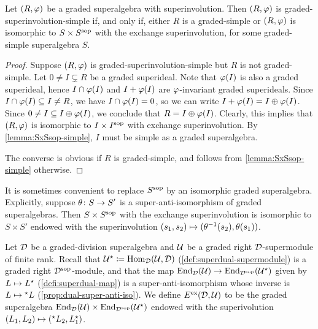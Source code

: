 \begin{prop}\label{prop:only-SxSsop-is-simple}
	Let $(R, \varphi)$ be a 
	graded superalgebra with superinvolution. 
	Then $(R, \varphi)$ is 
	graded-superinvolution-simple if, and only if, either $R$ is a graded-simple or $(R, \varphi)$ is isomorphic to $S\times S^{\mathrm{sop}}$ with the exchange superinvolution, for some graded-simple superalgebra $S$.
\end{prop}

\begin{proof}
	Suppose $(R, \varphi)$ is 
	graded-superinvolution-simple but $R$ is not graded-simple. 
	Let $0 \neq I \subsetneq R$ be a graded superideal.
	Note that $\varphi(I)$ is also a graded superideal, hence $I \cap \varphi(I)$ and $I + \varphi (I)$ are $\varphi$-invariant graded superideals. 
	Since $I \cap \varphi(I) \subseteq I \neq R$, we have $I \cap \varphi(I) = 0$, so we can write $I + \varphi (I) = I \oplus \varphi (I)$. 
	Since $0 \neq I \subseteq I \oplus \varphi (I)$, we conclude that $R = I \oplus \varphi (I)$.
	Clearly, this implies that $(R, \varphi)$ is isomorphic to $I \times I^{\mathrm{sop}}$ with exchange superinvolution. 
	By \cref{lemma:SxSsop-simple}, $I$ must be simple as a graded superalgebra. 
	
	The converse is obvious if $R$ is graded-simple, and follows from \cref{lemma:SxSsop-simple} otherwise.
\end{proof}
 
It is sometimes convenient to replace $S^{\mathrm{sop}}$ by an isomorphic graded superalgebra. 
Explicitly, suppose $\theta\colon S \to S'$ is a super-anti-isomorphism of graded superalgebras. 
Then $S\times S^{\mathrm{sop}}$ with the exchange superinvolution is isomorphic to $S\times S'$ endowed with the superinvolution $(s_1, s_2) \mapsto (\theta^{-1} (s_2), \theta (s_1))$. 

\begin{defi}\label{defi:superdual-exchange}
    Let $\mathcal{D}$ be a graded-division superalgebra and $\mathcal U$ be a graded right $\mathcal{D}$-supermodule of finite rank. 
    Recall that $\mathcal U^\star \coloneqq \operatorname{Hom}_{\mathcal{D}}(\mathcal U, \mathcal{D})$ (\cref{def:superdual-supermodule}) is a graded right $\mathcal{D}^{\mathrm{sop}}$-module, and that the map $\operatorname{End}_{\mathcal{D}} (\mathcal U) \to \operatorname{End}_{\mathcal{D}^{\mathrm{sop}}} (\mathcal U^\star)$ given by $L \mapsto L^\star$ (\cref{defi:superdual-map}) is a super-anti-isomorphism whose inverse is $L \mapsto {}^\star L$ (\cref{prop:dual-super-anti-iso}). 
    We define $E^{\mathrm{ex}} (\mathcal{D}, \mathcal U)$ to be the graded superalgebra $\operatorname{End}_{\mathcal{D}} (\mathcal U) \times \operatorname{End}_{\mathcal{D}^{\mathrm{sop}}} (\mathcal U^\star)$ endowed with the superivolution $(L_1, L_2) \mapsto ({}^\star L_2, L_1^\star)$.
\end{defi}

